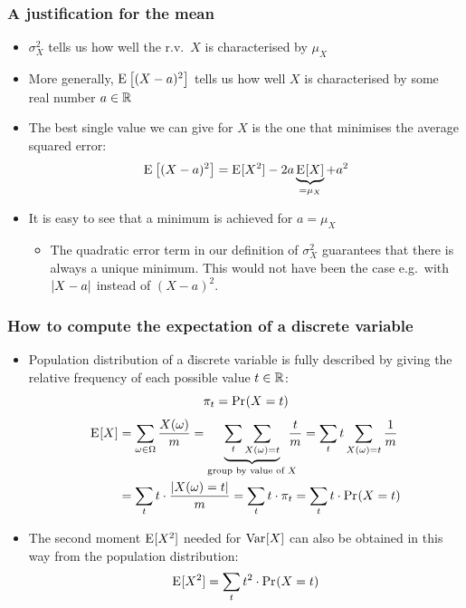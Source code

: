 \documentclass[t]{beamer} %
\begin{document}
\begin{frame}
  \frametitle{A justification for the mean}
  
  \begin{itemize}
  \item<1-> $\sigma^2_X$ tells us how well the r.v.\ $X$ is characterised by $\mu_X$
  \item<1-> More generally, $\mathrm{E}_{}\left[(X-a)^2\right]$ tells us how well $X$ is
    characterised by some real number $a\in\mathbb{R}$
  \item<2-> The best single value we can give for $X$ is the one that minimises
    the average squared error:
    \[
    \mathrm{E}_{}\left[(X-a)^2\right] = \mathrm{E}_{}[X^2] - 2 a \underbrace{\mathrm{E}_{}[X]}_{= \mu_X} + a^2
    \]
  \item<3-> It is easy to see that a minimum is achieved for $a = \mu_X$
    \begin{itemize}
    \item[\hand] The quadratic error term in our definition of $\sigma^2_X$
      guarantees that there is always a unique minimum.  This would not have
      been the case e.g.\ with $\lvert X - a\rvert$ instead of $(X - a)^2$.
    \end{itemize}
  \end{itemize}
\end{frame}

\begin{frame}
  \frametitle{How to compute the expectation of a discrete variable}

  \begin{itemize}
  \item Population distribution of a \h{discrete} variable is fully described
    by giving the relative frequency of each possible value $t\in \mathbb{R}$:
    \[
    \pi_t = \mathop{\mathrm{Pr}_{}}(X = t)
    \]
    \ungap[2]
    \begin{align*}
      \mathrm{E}_{}[X] &= \sum_{\omega\in\Omega} \frac{X(\omega)}{m}
      = \underbrace{\sum_t \sum_{X(\omega)=t}}_{\text{group by value of $X$}}
      \!\!\!\!\! \frac{t}{m}
      = \sum_t t \sum_{X(\omega)=t} \frac{1}{m} \\
      &= \sum_t t\cdot \frac{\lvert X(\omega)=t\rvert}{m} = \sum_t t\cdot \pi_t
      = \sum_t t\cdot \mathop{\mathrm{Pr}_{}}(X=t)
    \end{align*}
  \item<3-> The second moment $\mathrm{E}_{}[X^2]$ needed for $\mathop{\mathrm{Var}}_{}[X]$ can also be
    obtained in this way from the population distribution:
    \[
    \mathrm{E}_{}[X^2] = \sum_t t^2\cdot \mathop{\mathrm{Pr}_{}}(X=t)
    \]
  \end{itemize}
\end{frame}
\end{document}
